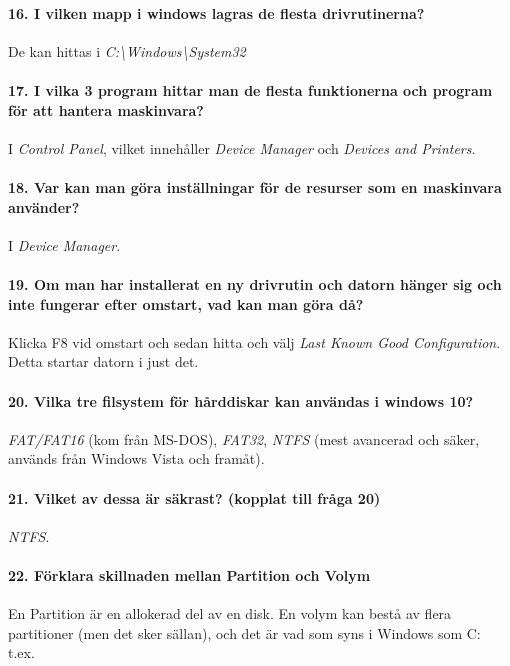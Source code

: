 \paragraph{16. I vilken mapp i windows lagras de flesta drivrutinerna?} De kan hittas i \textit{C:\textbackslash Windows\textbackslash System32}

\paragraph{17. I vilka 3 program hittar man de flesta funktionerna och program för att hantera maskinvara?}
I \textit{Control Panel}, vilket innehåller \textit{Device Manager} och \textit{Devices and Printers}.

\paragraph{18. Var kan man göra inställningar för de resurser som en maskinvara använder?} I \textit{Device Manager}.

\paragraph{19. Om man har installerat en ny drivrutin och datorn hänger sig och inte fungerar efter omstart, vad kan man göra då?} Klicka F8 vid omstart och sedan hitta och välj \textit{Last Known Good Configuration}. Detta startar datorn i just det.

\paragraph{20. Vilka tre filsystem för hårddiskar kan användas i windows 10?} \textit{FAT/FAT16} (kom från MS-DOS), \textit{FAT32}, \textit{NTFS} (mest avancerad och säker, används från Windows Vista och framåt).

\paragraph{21. Vilket av dessa är säkrast? (kopplat till fråga 20)} \textit{NTFS}.

\paragraph{22. Förklara skillnaden mellan Partition och Volym}
En Partition är en allokerad del av en disk. En volym kan bestå av flera partitioner (men det sker sällan), och det är vad som syns i Windows som C: t.ex.

